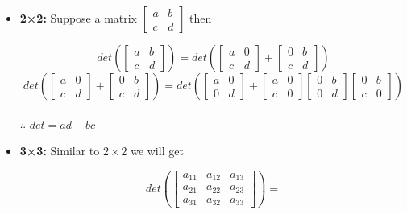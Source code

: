 \documentclass[a4paper,11pt]{article}
\numberwithin{equation}{section}
\begin{document}
\begin{itemize}
\begin{itemize}
    \item \textbf{2×2: }Suppose a matrix $\begin{bmatrix}
        a&b\\c&d  
    \end{bmatrix}$ then
    \begin{center}
        \[det\left(\begin{bmatrix}
            a&b\\c&d
        \end{bmatrix}\right)=
        det\left(\begin{bmatrix}
            a&0\\c&d
        \end{bmatrix}+\begin{bmatrix}
            0&b\\c&d
        \end{bmatrix}\right)
        \]
        \[
        det\left(\begin{bmatrix}
            a&0\\c&d
        \end{bmatrix}+\begin{bmatrix}
            0&b\\c&d
        \end{bmatrix}\right)=
        det\left(
            \begin{bmatrix}
                a&0\\0&d
            \end{bmatrix}+
            \begin{bmatrix}
                a&0\\c&0
            \end{bmatrix}
            \begin{bmatrix}
                0&b\\0&d
            \end{bmatrix}
            \begin{bmatrix}
                0&b\\c&0
            \end{bmatrix}
        \right)
        \]
        \vspace{0.1cm}\\
    $\therefore$ $det=ad-bc$
    \end{center}
\item \textbf{3×3: }Similar to $2\times 2$ we will get
\begin{center}
    \[
    det\left(\begin{bmatrix}
        a_{11}&a_{12}&a_{13}\\a_{21}&a_{22}&a_{23}\\a_{31}&a_{32}&a_{33}
    \end{bmatrix}\right)=
    \]


\end{center}
\end{itemize}
\end{itemize}
\end{document}
